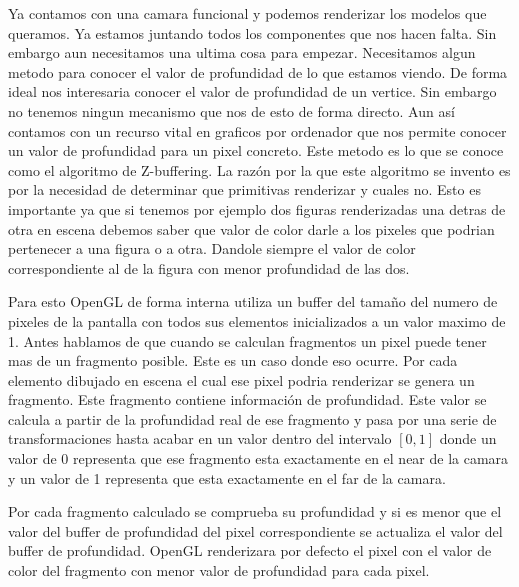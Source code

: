 Ya contamos con una camara funcional y podemos renderizar los modelos que queramos. Ya estamos juntando todos los componentes que nos hacen falta. Sin embargo aun necesitamos una ultima cosa para empezar. Necesitamos algun metodo para conocer el valor de profundidad de lo que estamos viendo. De forma ideal nos interesaria conocer el valor de profundidad de un vertice. Sin embargo no tenemos ningun mecanismo que nos de esto de forma directo. Aun así contamos con un recurso vital en graficos por ordenador que nos permite conocer
un valor de profundidad para un pixel concreto. Este metodo es lo que se conoce como el algoritmo de Z-buffering. La razón por la que este algoritmo se invento es por la necesidad de determinar que primitivas renderizar y cuales no. Esto es importante ya que si tenemos por ejemplo dos figuras renderizadas una detras de otra en escena debemos saber que valor de color darle a los pixeles que podrian pertenecer a una figura o a otra. Dandole siempre el valor de color correspondiente al de la figura con menor profundidad de las dos.

Para esto OpenGL de forma interna utiliza un buffer del tamaño del numero de pixeles de la pantalla con todos sus elementos inicializados a un valor maximo de 1. Antes hablamos de que cuando se calculan fragmentos un pixel puede tener mas de un fragmento posible. Este es un caso donde eso ocurre. Por cada elemento dibujado en escena el cual ese pixel podria renderizar se genera un fragmento. Este fragmento contiene información de profundidad. Este valor se calcula a partir de la profundidad real de ese fragmento y pasa por una serie de transformaciones
hasta acabar en un valor dentro del intervalo $[0,1]$ donde un valor de 0 representa que ese fragmento esta exactamente en el near de la camara y un valor de 1 representa que esta exactamente en el far de la camara.

Por cada fragmento calculado se comprueba su profundidad y si es menor que el valor del buffer de profundidad del pixel correspondiente se actualiza el valor del buffer de profundidad. OpenGL renderizara por defecto el pixel con el valor de color del fragmento con menor valor de profundidad para cada pixel. \cite{javatpointComputerGraphics}

